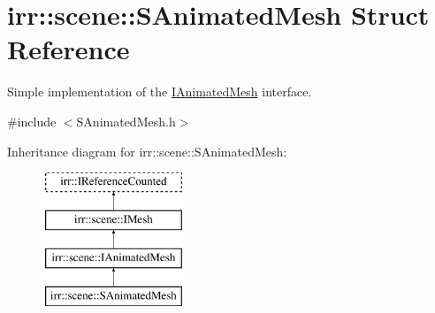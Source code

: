 \hypertarget{structirr_1_1scene_1_1SAnimatedMesh}{}\section{irr\+:\+:scene\+:\+:S\+Animated\+Mesh Struct Reference}
\label{structirr_1_1scene_1_1SAnimatedMesh}


Simple implementation of the \hyperlink{classirr_1_1scene_1_1IAnimatedMesh}{I\+Animated\+Mesh} interface.  




{\ttfamily \#include $<$S\+Animated\+Mesh.\+h$>$}

Inheritance diagram for irr\+:\+:scene\+:\+:S\+Animated\+Mesh\+:\begin{figure}[H]
\begin{center}
\leavevmode
\includegraphics[height=4.000000cm]{structirr_1_1scene_1_1SAnimatedMesh}
\end{center}
\end{figure}
